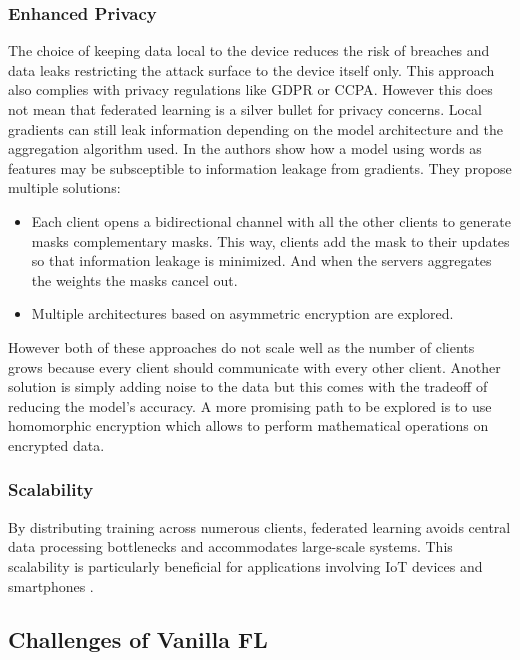 \subsubsection{Enhanced Privacy}
The choice of keeping data local to the device reduces the risk of breaches and data leaks restricting the
attack surface to the device itself only.
This approach also complies with privacy regulations like GDPR\cite{GDPR} or CCPA\cite{CCPA}.
However this does not mean that federated learning is a silver bullet for privacy concerns.
Local gradients can still leak information depending on the model architecture and the aggregation algorithm used.
In \cite{MultyPartyAggregation} the authors show how a model using words as features may be subsceptible to
information leakage from gradients.
They propose multiple solutions:
\begin{itemize}
  \item Each client opens a bidirectional channel with all the other clients to generate masks complementary masks.
    This way, clients add the mask to their updates so that information leakage is minimized. And when the
    servers aggregates the weights the masks cancel out.
  \item Multiple architectures based on asymmetric encryption are explored.
\end{itemize}
However both of these approaches do not scale well as the number of clients grows because every client should
communicate with every other client.
Another solution is simply adding noise to the data but this comes with the tradeoff of reducing the model's accuracy.
A more promising path to be explored is to use homomorphic encryption which allows to perform mathematical
operations on encrypted data.

\subsubsection{Scalability} By distributing training across numerous clients, federated learning avoids
central data processing bottlenecks and accommodates large-scale systems. This scalability is particularly
beneficial for applications involving IoT devices and smartphones \cite{Li2020}.

\subsection{Challenges of Vanilla FL} \label{sec:challenges-vanilla-fl}


